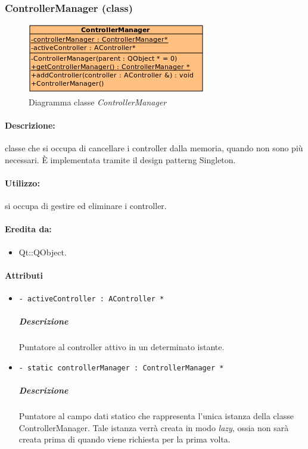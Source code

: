 	\subsubsection{ControllerManager (class)}
	\begin{figure}[!h]
		\centering
		\includegraphics[width=0.6\linewidth]{./Content/Immagini/controller/ControllerManager}
		\caption{Diagramma classe \textsl{ControllerManager}}
	\end{figure}
	\paragraph{Descrizione:} classe che si occupa di cancellare i controller dalla memoria, quando non sono più necessari. È implementata tramite il design patterng\g{} Singleton.
	\paragraph{Utilizzo:} si occupa di gestire ed eliminare i controller.
	\paragraph{Eredita da:}
		\begin{itemize}
			\item Qt::QObject.
		\end{itemize}
	\paragraph{Attributi}
		\begin{itemize}
			\item \color{teal} \verb!- activeController : AController *!
			\color{black}
			\subparagraph{Descrizione} Puntatore al controller attivo in un determinato istante.
			\item \color{teal} \verb!- static controllerManager : ControllerManager *!
			\color{black}
			\subparagraph{Descrizione} Puntatore al campo dati statico che rappresenta l'unica istanza della classe ControllerManager. Tale istanza verrà creata in modo \textit{lazy}, ossia non sarà creata prima di quando viene richiesta per la prima volta.
		\end{itemize}
